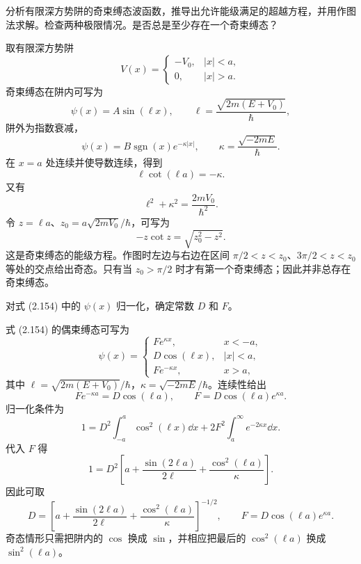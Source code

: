 \begin{question}
分析有限深方势阱的奇束缚态波函数，推导出允许能级满足的超越方程，并用作图法求解。检查两种极限情况。是否总是至少存在一个奇束缚态？
\end{question}
\begin{solution}
取有限深方势阱
\[
V(x)=\begin{cases}-V_0,& |x|<a,\\0,& |x|>a.
\end{cases}
\]
奇束缚态在阱内可写为
\[
\psi(x)=A\sin(\ell x),
\qquad
\ell=\frac{\sqrt{2m(E+V_0)}}{\hbar},
\]
阱外为指数衰减，
\[
\psi(x)=B\operatorname{sgn}(x)e^{-\kappa |x|},
\qquad
\kappa=\frac{\sqrt{-2mE}}{\hbar}.
\]
在 $x=a$ 处连续并使导数连续，得到
\[
\ell\cot(\ell a)=-\kappa.
\]
又有
\[
\ell^2+\kappa^2=\frac{2mV_0}{\hbar^2}.
\]
令 $z=\ell a$、$z_0=a\sqrt{2mV_0}/\hbar$，可写为
\[
-z\cot z=\sqrt{z_0^2-z^2}.
\]
这是奇束缚态的能级方程。作图时左边与右边在区间 $\pi/2<z<z_0$、$3\pi/2<z<z_0$ 等处的交点给出奇态。只有当 $z_0>\pi/2$ 时才有第一个奇束缚态；因此并非总存在奇束缚态。
\end{solution}

\begin{question}
对式 (2.154) 中的 $\psi(x)$ 归一化，确定常数 $D$ 和 $F$。

\par\smallskip
{}

\end{question}
\begin{solution}
式 (2.154) 的偶束缚态可写为
\[
\psi(x)=\begin{cases}
F e^{\kappa x},&x<-a,\\
D\cos(\ell x),& |x|<a,\\
F e^{-\kappa x},&x>a,
\end{cases}
\]
其中 $\ell=\sqrt{2m(E+V_0)}/\hbar$，$\kappa=\sqrt{-2mE}/\hbar$。连续性给出
\[
F e^{-\kappa a}=D\cos(\ell a),
\qquad
F=D\cos(\ell a)e^{\kappa a}.
\]
归一化条件为
\[
1=D^2\int_{-a}^{a}\cos^2(\ell x)\dd x
+2F^2\int_a^\infty e^{-2\kappa x}\dd x.
\]
代入 $F$ 得
\[
1=D^2\left[a+\frac{\sin(2\ell a)}{2\ell}+\frac{\cos^2(\ell a)}{\kappa}\right].
\]
因此可取
\[
D=\left[a+\frac{\sin(2\ell a)}{2\ell}+\frac{\cos^2(\ell a)}{\kappa}\right]^{-1/2},
\qquad
F=D\cos(\ell a)e^{\kappa a}.
\]
奇态情形只需把阱内的 $\cos$ 换成 $\sin$，并相应把最后的 $\cos^2(\ell a)$ 换成 $\sin^2(\ell a)$。
\end{solution}

